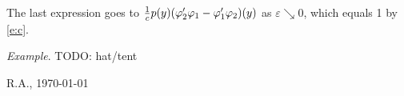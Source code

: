 \documentclass[12pt,a4paper]{article}
\begin{document}
    
    The last expression goes to 
    $
        \frac1c 
        p({y})
        (\varphi_2' \varphi_1 - \varphi_1' \varphi_2)({y}) 
    $
    as
    $\varepsilon \searrow 0$,
    which equals 1 by \eqref{e:c}.
  
     
    
    \emph{Example}. {\color{red} TODO: hat/tent} 
    
    \vfill\hfill 
    R.A., \today
\end{document}
